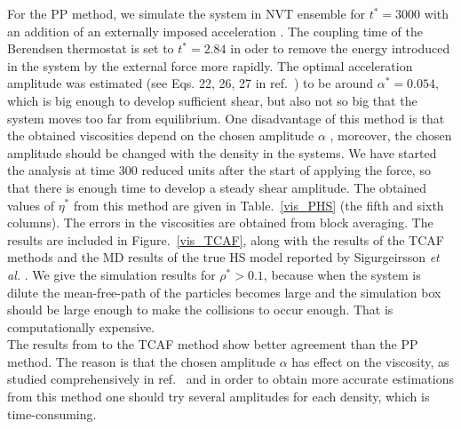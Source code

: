 \documentclass[preprint,pre,aps,superscriptaddress,a4paper]{revtex4}
\begin{document}
For the PP method, we simulate the system in  NVT ensemble for $t^*= 3000$ with an  addition of  an externally imposed acceleration  \cite{hess:02:0}. The coupling time of the Berendsen thermostat is set to $t^*= 2.84$ in oder to remove the energy introduced in the system by the external force more rapidly. 
The optimal acceleration amplitude was estimated (see Eqs. 22, 26, 27 in ref.~\cite{hess:02:0}) to be around $  \alpha^*= 0.054$, which is big enough to develop sufficient shear, but also not so big that the system moves too far from equilibrium. 
{  One disadvantage of this method  is that the obtained viscosities depend  on the chosen amplitude  $\alpha$ \cite{hess:02:0},  moreover, the chosen amplitude should be changed with the density in the systems. }
 We have started the analysis at time $300$ reduced units after the start of applying the force, so that there is enough time to develop a steady shear amplitude.
The obtained values of $\eta^*  $ from this method are given  in Table.~\ref{vis_PHS} (the fifth and sixth  columns).   The errors in the viscosities are  obtained from block averaging.
The results are included in Figure.~\ref{vis_TCAF}, along with the results of the TCAF methods and the MD results of the true HS model reported by Sigurgeirsson  {\it {et al.}} \cite{heyes:09:0}. We give the simulation results for $\rho^*>0.1$, because when the system is dilute the mean-free-path of the particles becomes large and  the  simulation box should be large enough to make the collisions to occur enough.  That is computationally expensive. \\
The results from to the TCAF method show better agreement than the PP method. The reason is that the chosen amplitude  $\alpha$ has  effect on the viscosity, as studied comprehensively in ref.~\cite{hess:02:0} and in order to obtain more accurate estimations from this method one should try several amplitudes for each density, which is time-consuming.
\end{document}
